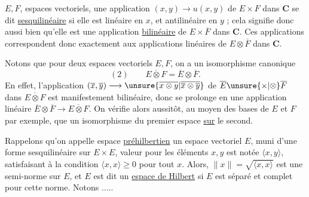 
$E,F$,   espaces vectoriels, une application $(x,y)\longrightarrow u(x,y)$  de $E\times F$  dans $\mathbf C$ se dit \uline{sesquilinéaire} si elle est linéaire en $x$, et antilinéaire en $y$ ; cela signifie donc aussi bien qu'elle est une application \uline{bilinéaire} de $E\times\overline F$ dans $\mathbf C$. Ces applications correspondent donc exactement aux applications linéaires de $E\otimes\overline F$ dans $\mathbf C$.


Notons que pour deux espaces vectoriels $E,F$, on a un isomorphisme canonique
\[
(2)\qquad\overline{E\otimes F}=\overline E\otimes\overline F.
\]
En effet, l'application $(\overline x,\overline y)\longrightarrow\unsure{\overline{x\otimes y}|\overline{\overline x\otimes\overline y}}$ de $\overline E\unsure{\times|\otimes}\overline F$ dans $\overline{E\otimes F}$ est manifestement bilinéaire, donc se prolonge en une application linéaire $\overline E\otimes\overline F\longrightarrow\overline{E\otimes F}$.
On vérifie alors aussitôt, au moyen des bases de $E$ et $F$ par exemple, que  un isomorphisme du premier espace \uline{sur} le second.

 Rappelons qu'on appelle espace \uline{préhilbertien} un espace vectoriel $E$, muni d'une forme sesquilinéaire sur $E\times E$,   valeur pour les éléments $x,y$ est notée $\langle x,y\rangle$, satisfaisant à la condition $\langle x,x\rangle\geq0$ pour tout $x$. Alors,
$\|x\|=\sqrt{\langle x,x\rangle}$ est une semi-norme sur $E$, et $E$ est dit un \uline{espace de Hilbert} si $E$ est séparé et complet pour cette norme.
Notons .....


